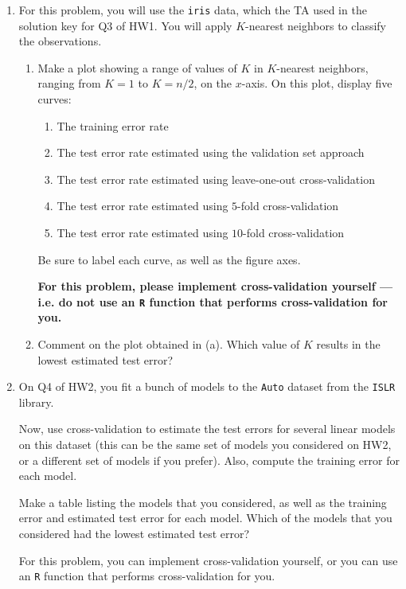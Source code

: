 \documentclass[12pt]{article}
\begin{document}
\begin{enumerate}


\item  For this problem, you will use the \verb=iris= data, which the TA used in the solution key for Q3 of HW1.  You will apply $K$-nearest neighbors to classify the observations. 

\begin{enumerate}
\item Make a plot showing a range of values of $K$ in $K$-nearest neighbors, ranging from $K=1$ to $K=n/2$, on the $x$-axis. On this plot, display five curves:
\begin{enumerate}
\item The training error rate
\item The test error rate estimated using the validation set approach
\item The test error rate estimated using leave-one-out cross-validation
\item The test error rate estimated using $5$-fold cross-validation
\item The test error rate estimated using $10$-fold cross-validation
\end{enumerate}
Be sure to label each curve, as well as the figure axes.

{\bf For this problem, please implement cross-validation yourself --- i.e. do not use an \verb=R= function that performs cross-validation for you.} 

\item Comment on the plot obtained in (a). Which value of $K$ results in the lowest estimated test error?
\end{enumerate}
  


\item On Q4 of HW2, you fit a bunch of models to the \verb=Auto= dataset from the \verb=ISLR= library. 

Now, use cross-validation to estimate the test errors for several linear models on this dataset (this can be the same set of models you considered on HW2, or a different set of models if you prefer).  Also, compute the training error for each model. 


Make a table listing the models that you considered, as well as the training error and estimated test error for each model. Which of the models that you considered had the lowest estimated test error? 

For this problem, you can implement cross-validation yourself, or you can use an \verb=R= function that performs cross-validation for you. 



\end{enumerate}
\end{document}

